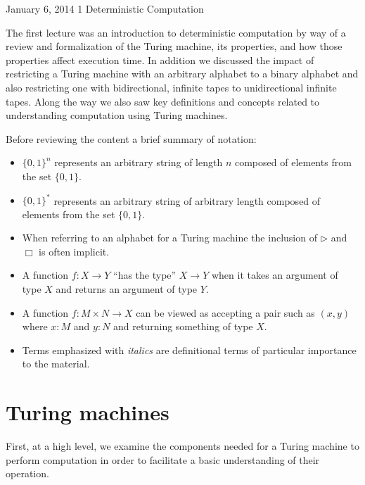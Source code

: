 \documentclass[usletter]{article}
\begin{document}
           {January 6, 2014}           %
           {1}                         %
           {Deterministic Computation} %

\noindent

The first lecture was an introduction to deterministic computation by way of a review and formalization of the Turing machine, its properties, and how those properties affect execution time. In addition we discussed the impact of restricting a Turing machine with an arbitrary alphabet to a binary alphabet and also restricting one with bidirectional, infinite tapes to unidirectional infinite tapes. Along the way we also saw key definitions and concepts related to understanding computation using Turing machines.

Before reviewing the content a brief summary of notation:

\begin{itemize}
  \item $\{0,1\}^n$ represents an arbitrary string of length $n$ composed of elements from the set $\{0,1\}$.
  \item $\{0,1\}^*$ represents an arbitrary string of arbitrary length composed of elements from the set $\{0,1\}$.
  \item When referring to an alphabet for a Turing machine the inclusion of $\rhd$ and $\Box$ is often implicit.
  \item A function $f : X \rightarrow Y$ ``has the type'' $X \rightarrow Y$ when it takes an argument of type $X$ and returns an argument of type $Y$.
  \item A function $f : M \times N \rightarrow X$ can be viewed as accepting a pair such as $(x, y)$ where $x : M$ and $y : N$ and returning something of type $X$.
  \item Terms emphasized with \textit{italics} are definitional terms of particular importance to the material.
\end{itemize}

\section{Turing machines} \label{sec:turing-machines}

First, at a high level, we examine the components needed for a Turing machine to perform computation in order to facilitate a basic understanding of their operation.
\end{document}
